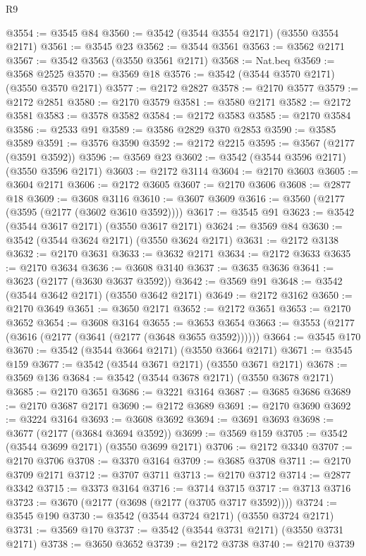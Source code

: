 \begin{lexlean}{R9}
\begin{coremodule}
@3554 := @3545 @84
@3560 := @3542 (@3544 @3554 @2171) (@3550 @3554 @2171)
@3561 := @3545 @23
@3562 := @3544 @3561
@3563 := @3562 @2171
@3567 := @3542 @3563 (@3550 @3561 @2171)
@3568 := Nat.beq
@3569 := @3568 @2525
@3570 := @3569 @18
@3576 := @3542 (@3544 @3570 @2171) (@3550 @3570 @2171)
@3577 := @2172 @2827
@3578 := @2170 @3577
@3579 := @2172 @2851
@3580 := @2170 @3579
@3581 := @3580 @2171
@3582 := @2172 @3581
@3583 := @3578 @3582
@3584 := @2172 @3583
@3585 := @2170 @3584
@3586 := @2533 @91
@3589 := @3586 @2829 @370 @2853
@3590 := @3585 @3589
@3591 := @3576 @3590
@3592 := @2172 @2215
@3595 := @3567 (@2177 (@3591 @3592))
@3596 := @3569 @23
@3602 := @3542 (@3544 @3596 @2171) (@3550 @3596 @2171)
@3603 := @2172 @3114
@3604 := @2170 @3603
@3605 := @3604 @2171
@3606 := @2172 @3605
@3607 := @2170 @3606
@3608 := @2877 @18
@3609 := @3608 @3116
@3610 := @3607 @3609
@3616 := @3560 (@2177 (@3595 (@2177 (@3602 @3610 @3592))))
@3617 := @3545 @91
@3623 := @3542 (@3544 @3617 @2171) (@3550 @3617 @2171)
@3624 := @3569 @84
@3630 := @3542 (@3544 @3624 @2171) (@3550 @3624 @2171)
@3631 := @2172 @3138
@3632 := @2170 @3631
@3633 := @3632 @2171
@3634 := @2172 @3633
@3635 := @2170 @3634
@3636 := @3608 @3140
@3637 := @3635 @3636
@3641 := @3623 (@2177 (@3630 @3637 @3592))
@3642 := @3569 @91
@3648 := @3542 (@3544 @3642 @2171) (@3550 @3642 @2171)
@3649 := @2172 @3162
@3650 := @2170 @3649
@3651 := @3650 @2171
@3652 := @2172 @3651
@3653 := @2170 @3652
@3654 := @3608 @3164
@3655 := @3653 @3654
@3663 := @3553 (@2177 (@3616 (@2177 (@3641 (@2177 (@3648 @3655 @3592))))))
@3664 := @3545 @170
@3670 := @3542 (@3544 @3664 @2171) (@3550 @3664 @2171)
@3671 := @3545 @159
@3677 := @3542 (@3544 @3671 @2171) (@3550 @3671 @2171)
@3678 := @3569 @136
@3684 := @3542 (@3544 @3678 @2171) (@3550 @3678 @2171)
@3685 := @2170 @3651
@3686 := @3221 @3164
@3687 := @3685 @3686
@3689 := @2170 @3687 @2171
@3690 := @2172 @3689
@3691 := @2170 @3690
@3692 := @3224 @3164
@3693 := @3608 @3692
@3694 := @3691 @3693
@3698 := @3677 (@2177 (@3684 @3694 @3592))
@3699 := @3569 @159
@3705 := @3542 (@3544 @3699 @2171) (@3550 @3699 @2171)
@3706 := @2172 @3340
@3707 := @2170 @3706
@3708 := @3370 @3164
@3709 := @3685 @3708
@3711 := @2170 @3709 @2171
@3712 := @3707 @3711
@3713 := @2170 @3712
@3714 := @2877 @3342
@3715 := @3373 @3164
@3716 := @3714 @3715
@3717 := @3713 @3716
@3723 := @3670 (@2177 (@3698 (@2177 (@3705 @3717 @3592))))
@3724 := @3545 @190
@3730 := @3542 (@3544 @3724 @2171) (@3550 @3724 @2171)
@3731 := @3569 @170
@3737 := @3542 (@3544 @3731 @2171) (@3550 @3731 @2171)
@3738 := @3650 @3652
@3739 := @2172 @3738
@3740 := @2170 @3739

\end{coremodule}
\end{lexlean}
